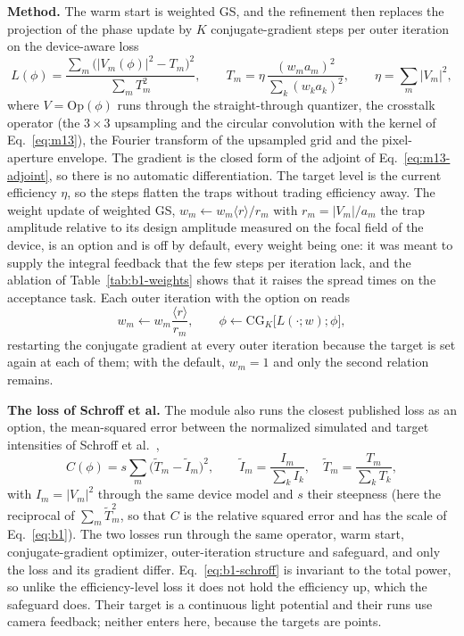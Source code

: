 \textbf{Method.} The warm start is weighted GS, and the refinement then replaces the projection of the phase update by $K$ conjugate-gradient steps per outer iteration on the device-aware loss
\begin{equation}
L(\phi)=\frac{\sum_m\big(|V_m(\phi)|^2-T_m\big)^2}{\sum_mT_m^2},\qquad
T_m=\eta\,\frac{(w_ma_m)^2}{\sum_k(w_ka_k)^2},\qquad \eta=\sum_m|V_m|^2,
\label{eq:b1}
\end{equation}
where $V=\mathrm{Op}(\phi)$ runs through the straight-through quantizer, the crosstalk operator (the $3\times3$ upsampling and the circular convolution with the kernel of Eq.~\eqref{eq:m13}), the Fourier transform of the upsampled grid and the pixel-aperture envelope. The gradient is the closed form of the adjoint of Eq.~\eqref{eq:m13-adjoint}, so there is no automatic differentiation. The target level is the current efficiency $\eta$, so the steps flatten the traps without trading efficiency away. The weight update of weighted GS, $w_m\leftarrow w_m\langle r\rangle/r_m$ with $r_m=|V_m|/a_m$ the trap amplitude relative to its design amplitude measured on the focal field of the device, is an option and is off by default, every weight being one: it was meant to supply the integral feedback that the few steps per iteration lack, and the ablation of Table~\ref{tab:b1-weights} shows that it raises the spread  times on the acceptance task. Each outer iteration with the option on reads
\begin{equation}
w_m\leftarrow w_m\frac{\langle r\rangle}{r_m},\qquad
\phi\leftarrow\mathrm{CG}_K\big[L(\cdot;w);\phi\big],
\label{eq:b1-outer}
\end{equation}
restarting the conjugate gradient at every outer iteration because the target is set again at each of them; with the default, $w_m=1$ and only the second relation remains.

\textbf{The loss of Schroff et al.} The module also runs the closest published loss as an option, the mean-squared error between the normalized simulated and target intensities of Schroff et al.~\cite{schroff},
\begin{equation}
C(\phi)=s\sum_{m}\big(\tilde T_m-\tilde I_m\big)^2,\qquad \tilde I_m=\frac{I_m}{\sum_kI_k},\quad \tilde T_m=\frac{T_m}{\sum_kT_k},
\label{eq:b1-schroff}
\end{equation}
with $I_m=|V_m|^2$ through the same device model and $s$ their steepness (here the reciprocal of $\sum_m\tilde T_m^2$, so that $C$ is the relative squared error and has the scale of Eq.~\eqref{eq:b1}). The two losses run through the same operator, warm start, conjugate-gradient optimizer, outer-iteration structure and safeguard, and only the loss and its gradient differ. Eq.~\eqref{eq:b1-schroff} is invariant to the total power, so unlike the efficiency-level loss it does not hold the efficiency up, which the safeguard does. Their target is a continuous light potential and their runs use camera feedback; neither enters here, because the targets are points.

